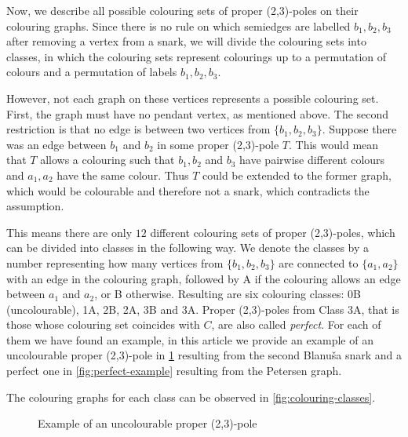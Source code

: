 \label{sec:colouring-classes}

Now, we describe all possible colouring sets of proper (2,3)-poles on their colouring graphs. Since there is no rule on which semiedges are labelled $b_1,b_2,b_3$ after removing a vertex from a snark, we will divide the colouring sets into classes, in which the colouring sets represent colourings up to a permutation of colours and a permutation of labels $b_1,b_2,b_3$.

However, not each graph on these vertices represents a possible colouring set. First, the graph must have no pendant vertex, as mentioned above. The second restriction is that no edge is between two vertices from $\{b_1,b_2,b_3\}$. Suppose there was an edge between $b_1$ and $b_2$ in some proper (2,3)-pole $T$. This would mean that $T$ allows a colouring such that $b_1,b_2$ and $b_3$ have pairwise different colours and $a_1,a_2$ have the same colour. Thus $T$ could be extended to the former graph, which would be colourable and therefore not a snark, which contradicts the assumption.

This means there are only $12$ different colouring sets of proper (2,3)-poles, which can be divided into classes in the following way. We denote the classes by a number representing how many vertices from $\{b_1,b_2,b_3\}$ are connected to $\{a_1,a_2\}$ with an edge in the colouring graph, followed by A if the colouring allows an edge between $a_1$ and $a_2$, or B otherwise. Resulting are six colouring classes: 0B (uncolourable), 1A, 2B, 2A, 3B and 3A. Proper (2,3)-poles from Class 3A, that is those whose colouring set coincides with $C$, are also called \textit{perfect}. For each of them we have found an example, in this article we provide an example of an uncolourable proper (2,3)-pole in \cref{fig:uncolourable-example} resulting from the second Blanuša snark and a perfect one in \cref{fig:perfect-example} resulting from the Petersen graph.

The colouring graphs for each class can be observed in \cref{fig:colouring-classes}.

\begin{figure}
	\centering
	\scalebox{0.7}{
		
	}
	\caption{Example of an uncolourable proper (2,3)-pole}
	\label{fig:uncolourable-example}
\end{figure}

